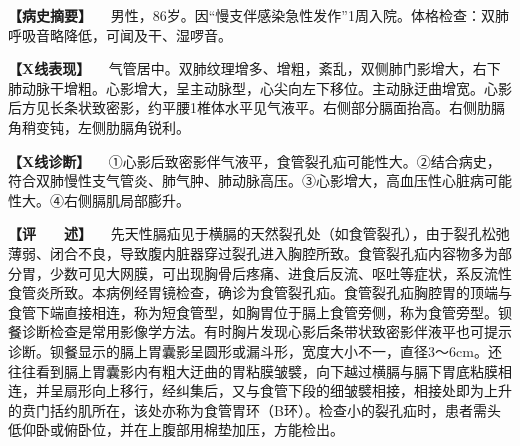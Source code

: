 \textbf{【病史摘要】}
　男性，86岁。因“慢支伴感染急性发作”1周入院。体格检查：双肺呼吸音略降低，可闻及干、湿啰音。

\textbf{【X线表现】}
　气管居中。双肺纹理增多、增粗，紊乱，双侧肺门影增大，右下肺动脉干增粗。心影增大，呈主动脉型，心尖向左下移位。主动脉迂曲增宽。心影后方见长条状致密影，约平腰1椎体水平见气液平。右侧部分膈面抬高。右侧肋膈角稍变钝，左侧肋膈角锐利。

\textbf{【X线诊断】}
　①心影后致密影伴气液平，食管裂孔疝可能性大。②结合病史，符合双肺慢性支气管炎、肺气肿、肺动脉高压。③心影增大，高血压性心脏病可能性大。④右侧膈肌局部膨升。

\textbf{【评　　述】}
　先天性膈疝见于横膈的天然裂孔处（如食管裂孔），由于裂孔松弛薄弱、闭合不良，导致腹内脏器穿过裂孔进入胸腔所致。食管裂孔疝内容物多为部分胃，少数可见大网膜，可出现胸骨后疼痛、进食后反流、呕吐等症状，系反流性食管炎所致。本病例经胃镜检查，确诊为食管裂孔疝。食管裂孔疝胸腔胃的顶端与食管下端直接相连，称为短食管型，如胸胃位于膈上食管旁侧，称为食管旁型。钡餐诊断检查是常用影像学方法。有时胸片发现心影后条带状致密影伴液平也可提示诊断。钡餐显示的膈上胃囊影呈圆形或漏斗形，宽度大小不一，直径3～6cm。还往往看到膈上胃囊影内有粗大迂曲的胃粘膜皱襞，向下越过横膈与膈下胃底粘膜相连，并呈扇形向上移行，经纠集后，又与食管下段的细皱襞相接，相接处即为上升的贲门括约肌所在，该处亦称为食管胃环（B环）。检查小的裂孔疝时，患者需头低仰卧或俯卧位，并在上腹部用棉垫加压，方能检出。

\protect\hypertarget{text00009.html}{}{}

